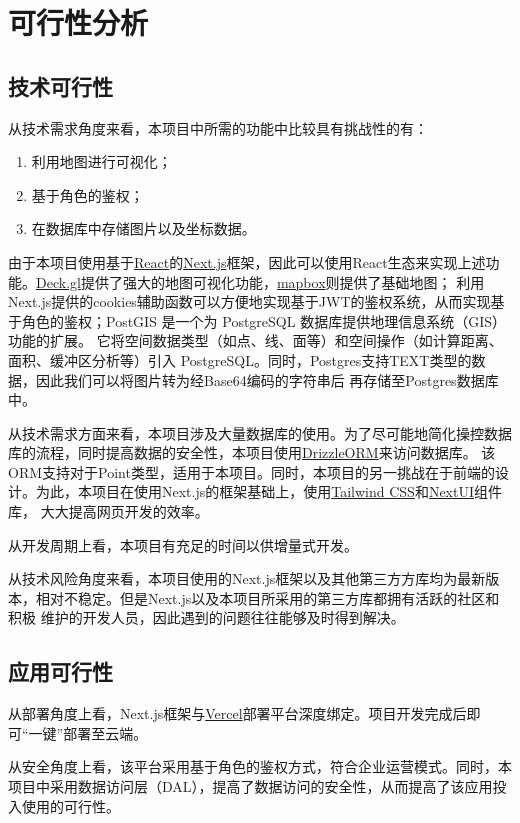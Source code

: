 \chapter{可行性分析}
\thispagestyle{empty}
\section{技术可行性}
从技术需求角度来看，本项目中所需的功能中比较具有挑战性的有：

\begin{enumerate}
    \item 利用地图进行可视化；
    \item 基于角色的鉴权；
    \item 在数据库中存储图片以及坐标数据。
\end{enumerate}

由于本项目使用基于\href{https://react.dev/}{React}的\href{https://nextjs.org/}{Next.js}框架，因此可以使用React生态来实现上述功能。\href{https://deck.gl/}{Deck.gl}提供了强大的地图可视化功能，\href{https://www.mapbox.com/}{mapbox}则提供了基础地图；
利用Next.js提供的cookies辅助函数可以方便地实现基于JWT的鉴权系统，从而实现基于角色的鉴权；PostGIS 是一个为 PostgreSQL 数据库提供地理信息系统（GIS）功能的扩展。
它将空间数据类型（如点、线、面等）和空间操作（如计算距离、面积、缓冲区分析等）引入 PostgreSQL。同时，Postgres支持TEXT类型的数据，因此我们可以将图片转为经Base64编码的字符串后
再存储至Postgres数据库中。

从技术需求方面来看，本项目涉及大量数据库的使用。为了尽可能地简化操控数据库的流程，同时提高数据的安全性，本项目使用\href{https://orm.drizzle.team/}{DrizzleORM}来访问数据库。
该ORM支持对于Point类型，适用于本项目。同时，本项目的另一挑战在于前端的设计。为此，本项目在使用Next.js的框架基础上，使用\href{https://tailwindcss.com/}{Tailwind CSS}和\href{https://nextui.org/}{NextUI}组件库，
大大提高网页开发的效率。

从开发周期上看，本项目有充足的时间以供增量式开发。

从技术风险角度来看，本项目使用的Next.js框架以及其他第三方方库均为最新版本，相对不稳定。但是Next.js以及本项目所采用的第三方库都拥有活跃的社区和积极
维护的开发人员，因此遇到的问题往往能够及时得到解决。

\section{应用可行性}

从部署角度上看，Next.js框架与\href{https://vercel.com/}{Vercel}部署平台深度绑定。项目开发完成后即可“一键”部署至云端。

从安全角度上看，该平台采用基于角色的鉴权方式，符合企业运营模式。同时，本项目中采用数据访问层（DAL），提高了数据访问的安全性，从而提高了该应用投入使用的可行性。